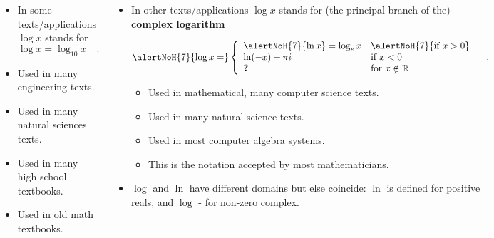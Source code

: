 \begin{frame}
 
\vskip -0.15cm
\begin{columns}
\begin{itemize}
\item<3-> In some texts/applications $\log x$ stands for
\[
\log x = \log_{10} x\quad .
\]
\item<4-> Used in many engineering texts.
\item<4-> Used in many natural sciences texts.
\item<4-> Used in many high school textbooks.
\item<4-> Used in old math textbooks.
\end{itemize}
\begin{itemize}
\item<5-> In other texts/applications $\log x$ stands for {\color{gray}(the principal branch of the)} \textbf{complex logarithm}

$
\alertNoH{7}{\log x =}\left\{\begin{array}{ll} \alertNoH{7}{\ln x} =\log_e x& \alertNoH{7}{ \text{if  } x>0} \\ \ln (-x) +\pi i&\text{if } x<0 \\ \textbf{?} &\text{for } x \notin \mathbb R\end{array}\right. \quad .
$
\begin{itemize}
\item<6-> Used in mathematical, many computer science texts.
\item<6-> Used in many natural science texts.
\item<6-> Used in most computer algebra systems.
\item<6-> This is the notation accepted by most mathematicians.
\end{itemize}
\item<7-> $\log $ and $\ln $ have different domains but else coincide: $\ln$ is defined for positive reals, and $\log$ - for non-zero complex.
\end{itemize}
\end{columns}
\end{frame}

